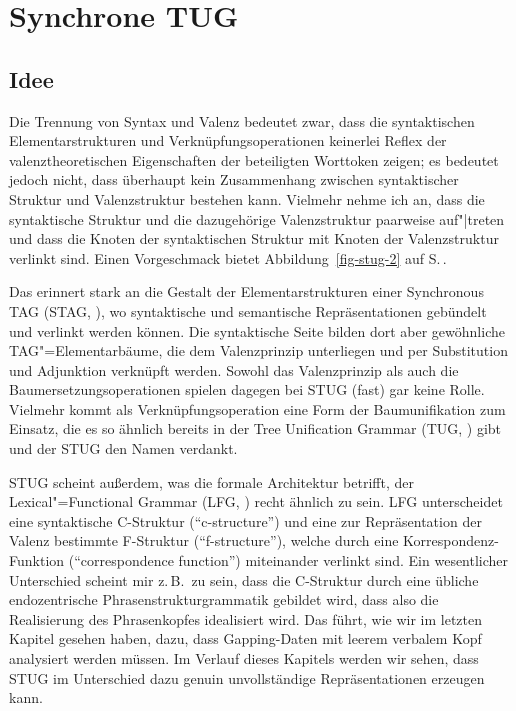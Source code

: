 \section{Synchrone TUG} \label{sec-stug-intro}

\subsection{Idee}

Die Trennung von Syntax und Valenz bedeutet zwar, dass die syntaktischen Elementarstrukturen und Verknüpfungsoperationen keinerlei Reflex der valenztheoretischen Eigenschaften der beteiligten Worttoken zeigen; es bedeutet jedoch nicht, dass überhaupt kein Zusammenhang zwischen syntaktischer Struktur und Valenzstruktur bestehen kann. Vielmehr nehme ich an, dass die syntaktische Struktur und die dazugehörige Valenzstruktur paarweise auf"|treten und dass die Knoten der syntaktischen Struktur mit Knoten der Valenzstruktur verlinkt sind. Einen Vorgeschmack bietet Abbildung~\ref{fig-stug-2} auf S.\,\pageref{fig-stug-2}.  

Das erinnert stark an die Gestalt der Elementarstrukturen einer Synchronous TAG (STAG, \citealt{Shieber:Schabes:90,Shieber:94,Nesson:Shieber:08}), wo syntaktische und semantische Repräsentationen gebündelt und verlinkt werden können. Die syntaktische Seite bilden dort aber gewöhnliche TAG"=Elementarbäume, die dem Valenzprinzip unterliegen und per Substitution und Adjunktion verknüpft werden. Sowohl das Valenzprinzip als auch die Baumersetzungsoperationen spielen dagegen bei STUG (fast) gar keine Rolle. Vielmehr kommt als Verknüpfungsoperation eine Form der Baumunifikation zum Einsatz, die es so ähnlich bereits in der Tree Unification Grammar (TUG, \citealt{Popowich:89,Gerdes:04}) gibt und der STUG den Namen verdankt.

STUG scheint außerdem, was die formale Architektur betrifft, der Lexical"=Functional Grammar (LFG, \citealt{Kaplan:Bresnan:82,Dalrymple:01,Asudeh:Toivonen:09}) recht ähnlich zu sein. LFG unterscheidet eine syntaktische C-Struktur ("`c-structure"') und eine zur Repräsentation der Valenz bestimmte F-Struktur ("`f-structure"'), welche durch eine Korrespondenz-Funktion ("`correspondence function"') miteinander verlinkt sind. Ein wesentlicher Unterschied scheint mir z.\,B.\ zu sein, dass die C-Struktur durch eine übliche endozentrische Phrasenstrukturgrammatik gebildet wird, dass also die Realisierung des Phrasenkopfes idealisiert wird. Das führt, wie wir im letzten Kapitel gesehen haben, dazu, dass Gapping-Daten mit leerem verbalem Kopf analysiert werden müssen. Im Verlauf dieses Kapitels werden wir sehen, dass STUG im Unterschied dazu genuin unvollständige Repräsentationen erzeugen kann.


